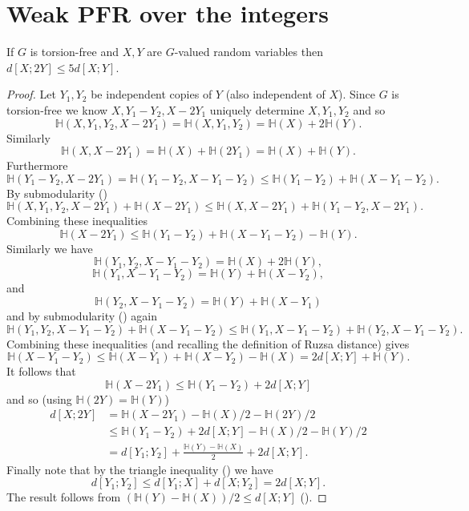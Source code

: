 \chapter{Weak PFR over the integers}

\begin{lemma}\label{torsion-free-doubling}\leanok
If $G$ is torsion-free and $X,Y$ are $G$-valued random variables then $d[X;2Y]\leq 5d[X;Y]$.
\end{lemma}
\begin{proof}\leanok
Let $Y_1,Y_2$ be independent copies of $Y$ (also independent of $X$). Since $G$ is torsion-free we know $X,Y_1-Y_2,X-2Y_1$ uniquely determine $X,Y_1,Y_2$ and so
\[\mathbb{H}(X,Y_1,Y_2,X-2Y_1)=\mathbb{H}(X,Y_1,Y_2)=\mathbb{H}(X)+2\mathbb{H}(Y).\]
Similarly
\[\mathbb{H}(X,X-2Y_1)=\mathbb{H}(X)+\mathbb{H}(2Y_1)=\mathbb{H}(X)+\mathbb{H}(Y).\]
Furthermore
\[\mathbb{H}(Y_1-Y_2,X-2Y_1)=\mathbb{H}(Y_1-Y_2,X-Y_1-Y_2)\leq \mathbb{H}(Y_1-Y_2)+\mathbb{H}(X-Y_1-Y_2).\]
By submodularity ()
\[\mathbb{H}(X,Y_1,Y_2,X-2Y_1)+\mathbb{H}(X-2Y_1)\leq \mathbb{H}(X,X-2Y_1)+\mathbb{H}(Y_1-Y_2,X-2Y_1).\]
Combining these inequalities
\[\mathbb{H}(X-2Y_1)\leq \mathbb{H}(Y_1-Y_2)+\mathbb{H}(X-Y_1-Y_2)-\mathbb{H}(Y).\]
Similarly we have
\[\mathbb{H}(Y_1,Y_2,X-Y_1-Y_2)=\mathbb{H}(X)+2\mathbb{H}(Y),\]
\[\mathbb{H}(Y_1,X-Y_1-Y_2)=\mathbb{H}(Y)+\mathbb{H}(X-Y_2),\]
and
\[\mathbb{H}(Y_2,X-Y_1-Y_2)=\mathbb{H}(Y)+\mathbb{H}(X-Y_1)\]
and by submodularity () again
\[\mathbb{H}(Y_1,Y_2,X-Y_1-Y_2)+ \mathbb{H}(X-Y_1-Y_2)\leq \mathbb{H}(Y_1,X-Y_1-Y_2)+\mathbb{H}(Y_2,X-Y_1-Y_2).\]
Combining these inequalities (and recalling the definition of Ruzsa distance) gives
\[\mathbb{H}(X-Y_1-Y_2)\leq \mathbb{H}(X-Y_1)+\mathbb{H}(X-Y_2)-\mathbb{H}(X)=2d[X;Y]+\mathbb{H}(Y).\]
It follows that
\[\mathbb{H}(X-2Y_1)\leq \mathbb{H}(Y_1-Y_2)+2d[X;Y]\]
and so (using $\mathbb{H}(2Y)=\mathbb{H}(Y)$)
\begin{align*}
d[X;2Y]
&=\mathbb{H}(X-2Y_1)-\mathbb{H}(X)/2-\mathbb{H}(2Y)/2\\
&\leq \mathbb{H}(Y_1-Y_2)+2d[X;Y]-\mathbb{H}(X)/2-\mathbb{H}(Y)/2\\
&= d[Y_1;Y_2]+\frac{\mathbb{H}(Y)-\mathbb{H}(X)}{2}+2d[X;Y].
\end{align*}
Finally note that by the triangle inequality () we have
\[d[Y_1;Y_2]\leq d[Y_1;X]+d[X;Y_2]=2d[X;Y].\]
The result follows from $(\mathbb{H}(Y)-\mathbb{H}(X))/2\leq d[X;Y]$ ().
\end{proof}

